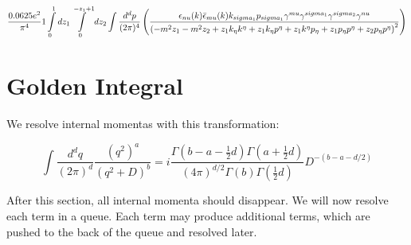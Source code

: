 \begin{dmath}\frac{0.0625 e^{2}}{\pi^{4}}1\int\limits_{ 0 }^{ 1 } d{ z_{ 1 } }\int\limits_{ 0 }^{ - { z_{ 1 } } + 1 } d{ z_{ 2 } }\int\frac{d^d p }{ (2\pi)^4 }\left(\frac{\epsilon_{ \\nu }({ k }) \bar{\epsilon}_{ \\mu }({ k }) { { k }_{ \\sigma_1 } } { { p }_{ \\sigma_1 } } { \gamma^{ \\mu } } { \gamma^{ \\sigma_1 } } { \gamma^{ \\sigma_2 } } { \gamma^{ \\nu } }}{\left(- m^{2} { z_{ 1 } } - m^{2} { z_{ 2 } } + { z_{ 1 } } { { k }_{ \eta } } { { k }^{ \eta } } + { z_{ 1 } } { { k }_{ \eta } } { { p }^{ \eta } } + { z_{ 1 } } { { k }^{ \eta } } { { p }_{ \eta } } + { z_{ 1 } } { { p }_{ \eta } } { { p }^{ \eta } } + { z_{ 2 } } { { p }_{ \eta } } { { p }^{ \eta } }\right)^{2}}\right)\end{dmath}
\section*{{Golden Integral}}
We resolve internal momentas with this transformation:

    $$\int \frac{d^d q}{(2 \pi)^d} \frac{(q^2)^a}{(q^2 + D)^b} = i \frac{\Gamma (b-a-\frac{1}{2}d) \Gamma (a + \frac{1}{2} d)}{(4 \pi)^{d/2} \Gamma(b) \Gamma(\frac{1}{2}d)} D^{-(b-a-d/2)}$$
    
After this section, all internal momenta should disappear.  We will now resolve each term in a queue.  Each term may produce additional terms, which are pushed to the back of the queue and resolved later.
